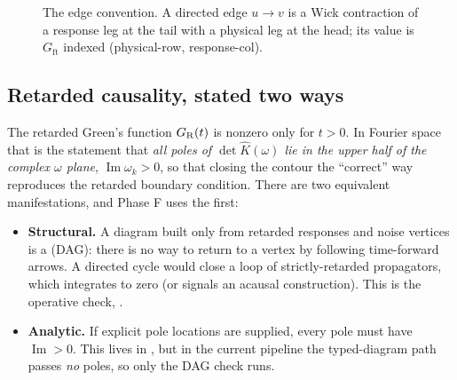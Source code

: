 \begin{figure}[ht]
\centering
{}
\caption{The edge convention. A directed edge $u\to v$ is a Wick contraction of a
response leg at the tail with a physical leg at the head; its value is
$G_{\mathrm{ft}}$ indexed (physical-row, response-col).}
\label{fig:ta-edge}
\end{figure}

\subsection{Retarded causality, stated two ways}

The retarded Green's function $G_{\mathrm R}(t)$ is nonzero only for $t>0$. In Fourier
space that is the statement that \emph{all poles of $\det\hat K(\omega)$ lie in
the upper half of the complex $\omega$ plane}, $\operatorname{Im}\omega_k > 0$, so
that closing the contour the ``correct'' way reproduces the retarded boundary
condition. There are two equivalent manifestations, and Phase F uses the first:

\begin{itemize}
  \item \textbf{Structural.} A diagram built only from retarded responses and
        noise vertices is a  (DAG): there is no way
        to return to a vertex by following time-forward arrows. A directed cycle
        would close a loop of strictly-retarded propagators, which integrates to
        zero (or signals an acausal construction). This is the operative check,
        .
  \item \textbf{Analytic.} If explicit pole locations are supplied, every pole
        must have $\operatorname{Im} > 0$. This lives in
        , but in the current pipeline the typed-diagram
        path passes \emph{no} poles, so only the DAG check runs.
\end{itemize}

